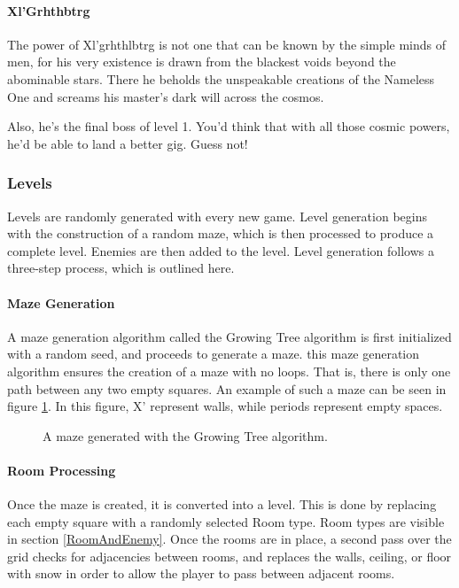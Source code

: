 \documentclass{article}
\begin{document}
\paragraph{Xl'Grhthbtrg}
The power of Xl'grhthlbtrg is not one that can be known by the simple minds of men, for his very existence is drawn from the blackest voids beyond the abominable stars. There he beholds the unspeakable creations of the Nameless One and screams his master's dark will across the cosmos.

Also, he’s the final boss of level 1.  You’d think that with all those cosmic powers, he’d be able to land a better gig.  Guess not!


\subsubsection{Levels}

Levels are randomly generated with every new game.  Level generation begins with the construction of a random maze, which is then processed to produce a complete level.  Enemies are then added to the level.  Level generation follows a three-step process, which is outlined here.

\paragraph{Maze Generation}
A maze generation algorithm called the Growing Tree algorithm is first initialized with a random seed, and proceeds to generate a maze.  this maze generation algorithm ensures the creation of a maze with no loops.  That is, there is only one path between any two empty squares.  An example of such a maze can be seen in figure \ref{TextMaze}.  In this figure, X' represent walls, while periods represent empty spaces.

\begin{figure}[htbp]
	
	\caption{A maze generated with the Growing Tree algorithm.}
	\label{TextMaze}
\end{figure}

\paragraph{Room Processing}
Once the maze is created, it is converted into a level.  This is done by replacing each empty square with a randomly selected Room type.  Room types are visible in section \ref{RoomAndEnemy}.  Once the rooms are in place, a second pass over the grid checks for adjacencies between rooms, and replaces the walls, ceiling, or floor with snow in order to allow the player to pass between adjacent rooms.
\end{document}
